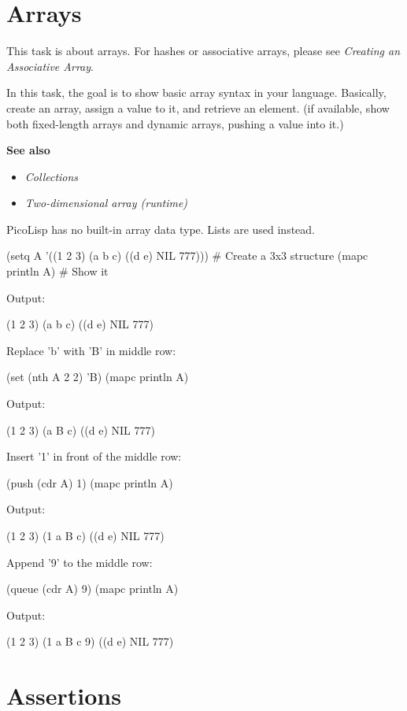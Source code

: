 \pagebreak{}
\section*{Arrays}

This task is about arrays. For hashes or associative arrays, please see
\emph{Creating an Associative Array}.

In this task, the goal is to show basic array syntax in your language.
Basically, create an array, assign a value to it, and retrieve an
element. (if available, show both fixed-length arrays and dynamic
arrays, pushing a value into it.)

\textbf{See also}

\begin{itemize}
\item
  \emph{Collections}
\item
  \emph{Two-dimensional array (runtime)}
\end{itemize}


\begin{wideverbatim}

PicoLisp has no built-in array data type. Lists are used instead.

(setq A '((1 2 3) (a b c) ((d e) NIL 777)))  # Create a 3x3 structure
(mapc println A)  # Show it

Output:

(1 2 3)
(a b c)
((d e) NIL 777)

Replace 'b' with 'B' in middle row:

(set (nth A 2 2) 'B)
(mapc println A)

Output:

(1 2 3)
(a B c)
((d e) NIL 777)

Insert '1' in front of the middle row:

(push (cdr A) 1)
(mapc println A)

Output:

(1 2 3)
(1 a B c)
((d e) NIL 777)

Append '9' to the middle row:

(queue (cdr A) 9)
(mapc println A)

Output:

(1 2 3)
(1 a B c 9)
((d e) NIL 777)

\end{wideverbatim}

\pagebreak{}
\section*{Assertions}

